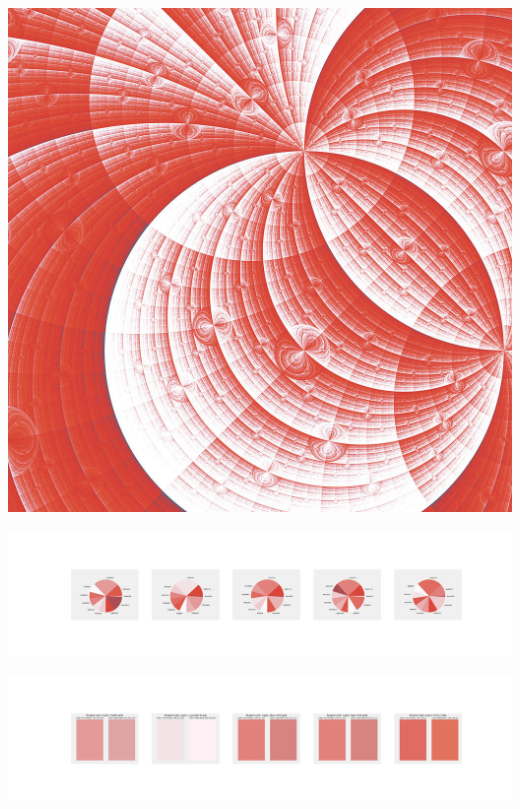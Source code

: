 \documentclass[11pt]{article}
\begin{document}
\begin{landscape}
    \begin{center}
    \includegraphics[width=\textwidth]{./nbimg/file (412).jpg}
    \end{center}

    \begin{center}
    \includegraphics[width=250mm]{./nbimg/pie-348.jpg}
    \end{center}

    \begin{center}
    \includegraphics[width=250mm]{./nbimg/peak-348.jpg}
    \end{center}
    


\end{landscape}
\end{document}
